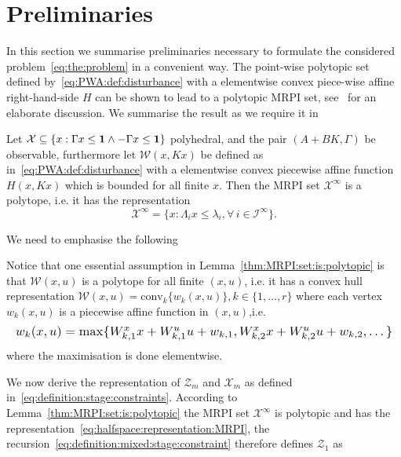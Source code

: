 \documentclass{ifacconf}
\newcommand*{\Resize}[1]{\resizebox{\columnwidth}{!}{$#1$}}
\providecommand{\conv}{\text{conv}}
\begin{document}
\section{Preliminaries}\label{sec:preliminaries}
In this section we summarise preliminaries necessary to formulate the considered problem~\eqref{eq:the:problem}
in a convenient way. The point-wise polytopic set defined by~\eqref{eq:PWA:def:disturbance} with a elementwise convex 
piece-wise affine right-hand-side $H$ can be shown to lead to a polytopic MRPI set, see~\cite{Schaich:2015} for an 
elaborate discussion. We summarise the result as we require it in
%
\begin{lem}\label{thm:MRPI:set:is:polytopic}
Let $\mathcal X \subseteq \{x:\Gamma x\leq{\bf{1}}\wedge-\Gamma x\leq{\bf{1}}\}$ polyhedral, and the pair $(A+BK,\Gamma)$ be
observable, furthermore let $\mathcal W(x,Kx)$ be defined as in~\eqref{eq:PWA:def:disturbance} with a elementwise convex piecewise
affine function $H(x,Kx)$ which is bounded for all finite $x$. Then the MRPI set $\mathcal X^\infty$ is a polytope, i.e.
it has the representation 
\begin{equation}\label{eq:halfspace:representation:MRPI}
	\mathcal X^\infty=\{x:\Lambda_i x\leq \lambda_i, \forall\, i\in\mathcal I^\infty\}.
\end{equation}
\end{lem}
%
We need to emphasise the following 
\begin{rem}\label{rem:vertex:representation}
Notice that one essential assumption in Lemma~\ref{thm:MRPI:set:is:polytopic} is that $\mathcal W(x,u)$ is a polytope
for all finite $(x,u)$, i.e. it has a convex hull representation $\mathcal W(x,u) = \conv_k\{w_k(x,u)\}, k\in\{1,\dots,r\}$ where each 
vertex~$w_k(x,u)$ is a piecewise affine function in $(x,u)$,i.e.
\begin{equation}
\Resize{
	w_k(x,u) = \max\{W_{k,1}^x x + W_{k,1}^u u + w_{k,1},W_{k,2}^x x + W_{k,2}^u u + w_{k,2},\dots\}
}
\end{equation}
where the maximisation is done elementwise.
\end{rem}
%
We now derive the representation of $\mathcal Z_m$ and $\mathcal X_m$ as defined in~\eqref{eq:definition:stage:constraints}.
According to Lemma~\ref{thm:MRPI:set:is:polytopic} the MRPI set $\mathcal X^\infty$ is polytopic and has the 
representation~\eqref{eq:halfspace:representation:MRPI}, the recursion~\eqref{eq:definition:mixed:stage:constraint}
therefore defines $\mathcal Z_1$ as
\end{document}
